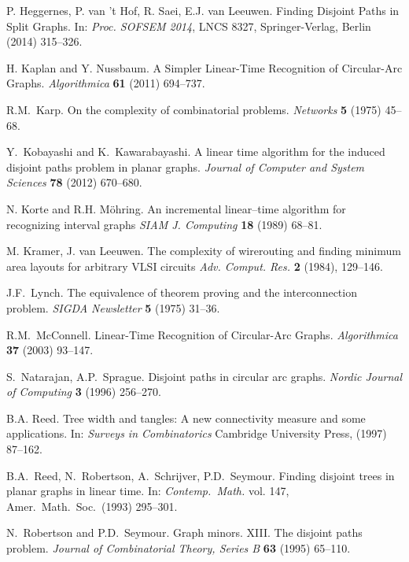 \documentclass{llncs}
\begin{document}
\begin{thebibliography}{10}
P. Heggernes, P. van 't Hof, R. Saei, E.J. van Leeuwen.
Finding Disjoint Paths in Split Graphs.
In: {\em Proc. SOFSEM 2014}, LNCS 8327, 
Springer-Verlag, Berlin 
(2014) 315--326.

H. Kaplan and Y. Nussbaum.
A Simpler Linear-Time Recognition of Circular-Arc Graphs.
{\em Algorithmica} {\bf 61} (2011) 694--737.

R.M.~Karp.
On the complexity of combinatorial problems.
{\em Networks} {\bf 5} (1975) 45--68.

Y.~Kobayashi and K.~Kawarabayashi.
A linear time algorithm for the induced disjoint paths problem in planar graphs.
{\em Journal of Computer and System Sciences} {\bf 78} (2012) 670--680.


N. Korte and R.H. M\"ohring.
An incremental linear--time algorithm for recognizing interval graphs
{\em SIAM J. Computing} {\bf 18} (1989) 68--81.

M. Kramer, J. van Leeuwen.
The complexity of wirerouting and finding minimum area layouts for arbitrary {VLSI} circuits
\emph{Adv. Comput. Res.} {\bf 2} (1984), 129--146.


J.F.~Lynch. The equivalence of theorem proving and the interconnection problem. 
{\em SIGDA Newsletter} {\bf 5} (1975) 31--36.

R.M.~McConnell. Linear-Time Recognition of Circular-Arc Graphs. \emph{Algorithmica} {\bf 37} (2003) 93--147.

S.~Natarajan, A.P.~Sprague. Disjoint paths in circular arc graphs. \emph{Nordic Journal of Computing} {\bf 3} (1996) 256--270.

B.A. Reed.
Tree width and tangles: A new connectivity measure and some applications.
In: \emph{Surveys in Combinatorics} Cambridge University Press, (1997) 87--162.

 B.A.~Reed, N.~Robertson, A.~Schrijver, P.D.~Seymour.  Finding disjoint trees in planar graphs in linear time.
In: {\em Contemp.\ Math.} vol. 147, 
Amer.\ Math.\ Soc.\ 
(1993) 295--301.

N.~Robertson and P.D.~Seymour.
Graph minors. XIII. The disjoint paths problem.
{\em Journal of Combinatorial Theory, Series B} {\bf 63} (1995) 65--110.
\end{thebibliography}

\appendix
\end{document}
